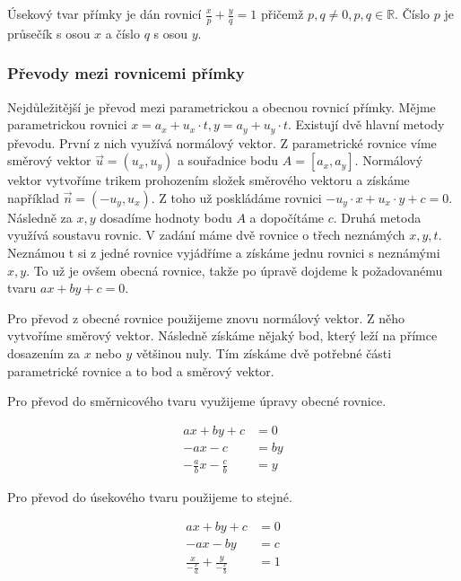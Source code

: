 \documentclass[12pt]{article}
\begin{document}
Úsekový tvar přímky je dán rovnicí $\frac{x}{p} + \frac{y}{q} = 1$ přičemž $p, q \ne 0, p, q \in
\mathbb{R}$. Číslo $p$ je průsečík s osou $x$ a číslo $q$ s osou $y$.

\subsubsection*{Převody mezi rovnicemi přímky}
Nejdůležitější je převod mezi parametrickou a obecnou rovnicí přímky. Mějme parametrickou rovnici
$x = a_x + u_x \cdot t, y = a_y + u_y \cdot t$. Existují dvě hlavní metody převodu. První z nich
využívá normálový vektor. Z parametrické rovnice víme směrový vektor $\vec{u} = (u_x, u_y)$ a
souřadnice bodu $A = [a_x, a_y]$. Normálový vektor vytvoříme trikem prohozením složek směrového
vektoru a získáme například $\vec{n} = (-u_y, u_x)$. Z toho už poskládáme rovnici $-u_y \cdot x +
u_x \cdot y + c = 0$. Následně za $x, y$ dosadíme hodnoty bodu $A$ a dopočítáme $c$. Druhá
metoda využívá soustavu rovnic. V zadání máme dvě rovnice o třech neznámých $x, y, t$. Neznámou
t si z jedné rovnice vyjádříme a získáme jednu rovnici s neznámými $x, y$. To už je ovšem obecná
rovnice, takže po úpravě dojdeme k požadovanému tvaru $ax + by + c = 0$.

Pro převod z obecné rovnice použijeme znovu normálový vektor. Z něho vytvoříme směrový vektor.
Následně získáme nějaký bod, který leží na přímce dosazením za $x$ nebo $y$ většinou nuly. Tím
získáme dvě potřebné části parametrické rovnice a to bod a směrový vektor.

Pro převod do směrnicového tvaru využijeme úpravy obecné rovnice.

\[
\begin{aligned}
    ax + by + c &= 0 \\
    -ax -c &= by \\
    -\frac{a}{b}x -\frac{c}{b} &= y
\end{aligned}
\]

Pro převod do úsekového tvaru použijeme to stejné.

\[
\begin{aligned}
    ax + by + c &= 0 \\
    -ax -by &= c \\
    \frac{x}{-\frac{c}{a}} + \frac{y}{-\frac{c}{b}} &= 1
\end{aligned}
\]
\end{document}
